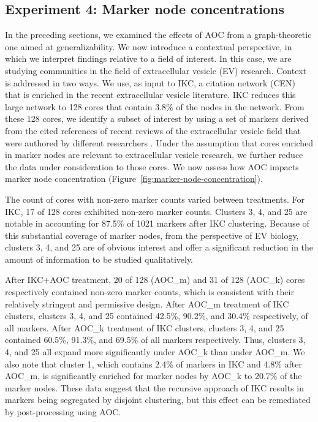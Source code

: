 \documentclass[12pt, oneside]{article}   	%
\begin{document}
\subsection{Experiment 4: Marker node concentrations}

In the preceding sections, we examined the effects of AOC from a graph-theoretic one aimed at generalizability. We now introduce a contextual perspective, in which we interpret findings relative to a field of interest. In this case, we are studying communities in the field of extracellular vesicle (EV) research. Context is addressed in two ways. We use, as input to IKC, a citation network (CEN) that is enriched in the recent extracellular vesicle literature. IKC reduces this large network to 128 cores that contain 3.8\% of the nodes in the network. From these 128 cores, we identify a subset of interest by using a set of markers derived from the cited references of recent reviews of the extracellular vesicle field that were authored by different researchers \citep{Wedell2022}. Under the assumption that cores enriched in marker nodes are relevant to extracellular vesicle research, we further reduce the data under consideration to those cores. We now assess how AOC impacts marker node concentration (Figure~\ref{fig:marker-node-concentration}).

The count of cores with non-zero marker counts varied between treatments. For IKC, 17 of 128 cores exhibited  non-zero marker counts. Clusters 3, 4, and 25 are notable in accounting for 87.5\% of 1021 markers after IKC clustering. Because of this substantial coverage of marker nodes, from the perspective of EV biology, clusters 3, 4, and 25 are of obvious interest and offer a significant reduction in the amount of information to be studied qualitatively.  

After IKC+AOC treatment, 20 of 128 (AOC\_m) and 31 of 128 (AOC\_k) cores respectively contained non-zero marker counts, which is consistent with their relatively stringent and permissive design. After AOC\_m treatment of IKC clusters, clusters 3, 4, and 25  contained 42.5\%, 90.2\%, and 30.4\% respectively, of all markers. After AOC\_k treatment of IKC clusters, clusters  3, 4, and 25 contained 60.5\%, 91.3\%, and 69.5\% of all markers respectively.  Thus,  clusters 3, 4, and 25 all expand more significantly under AOC\_k than under AOC\_m. We also note that cluster 1, which contains 2.4\% of markers in IKC and 4.8\% after AOC\_m, is significantly enriched for marker nodes by AOC\_k to 20.7\% of the marker nodes. These data  suggest that the recursive approach of IKC results in markers being segregated by disjoint clustering, but this effect can be remediated by post-processing using AOC.
\end{document}
